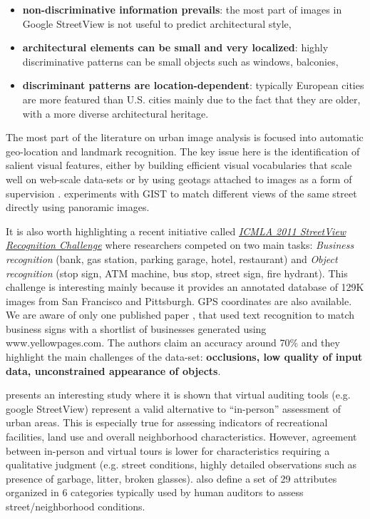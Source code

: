 \documentclass[runningheads, table]{llncs}
\begin{document}
\begin{itemize}
\item \textbf{non-discriminative information prevails}: the most part of images in Google StreetView is not useful to predict architectural style, 
\item \textbf{architectural elements can be small and very localized}: highly discriminative patterns can be small objects such as windows, balconies,
\item \textbf{discriminant patterns are location-dependent}: typically European cities are more featured than U.S. cities mainly due to the fact that they are older, with a more diverse architectural heritage.  
\end{itemize}

The most part of the literature on urban image analysis \cite{SBS07,knopp2010avoiding,li2009landmark} is  focused into automatic geo-location and landmark recognition. The key issue here is the identification of salient visual features, either by building efficient visual vocabularies that scale well on web-scale data-sets \cite{SBS07} or by using geotags attached to  images as a form of supervision \cite{knopp2010avoiding}. \cite{murillo2009experiments} experiments with GIST to match different views of the same street directly using panoramic images.

It is also worth highlighting a recent initiative called \href{http://www.icmla-conference.org/icmla11/}{\em ICMLA 2011 StreetView Recognition Challenge} where researchers competed on two main tasks: \emph{Business recognition} (bank, gas station, parking garage, hotel, restaurant) and \emph{Object recognition} (stop sign, ATM machine, bus stop, street sign, fire hydrant). 
This challenge is interesting  mainly because it provides an annotated database of 129K images from San Francisco and Pittsburgh. GPS coordinates are also available.  
We are aware of only one published paper \cite{zamir2011street}, that used text recognition to match business signs with a shortlist of businesses generated using www.yellowpages.com. The authors claim an accuracy around 70\% and they highlight the main challenges of the data-set: \textbf{occlusions, low quality of input data, unconstrained appearance of objects}. 

\cite{audit2011} presents an interesting study where it is shown that virtual auditing tools (e.g. google StreetView) represent a valid alternative to ``in-person'' assessment of urban areas. This is especially true for assessing indicators of recreational facilities, land use and overall neighborhood characteristics. However, agreement between in-person and virtual tours is lower for characteristics requiring a qualitative judgment (e.g. street conditions, highly detailed observations such as presence of garbage, litter, broken glasses). 
\cite{audit2011} also define a set of 29 attributes organized in 6 categories typically used by human auditors to assess street/neighborhood conditions.
\end{document}

